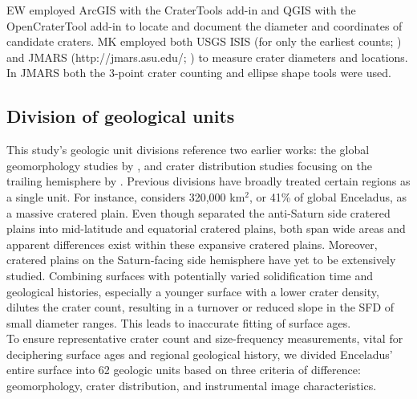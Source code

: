 \documentclass[preprint,11pt,3p,times,authoryear]{elsarticle}
\begin{document}
EW employed ArcGIS with the CraterTools add-in \citep{Kneissl2011} and QGIS with the OpenCraterTool add-in \citep{Heyer2023} to locate and document the diameter and coordinates of candidate craters. MK employed both USGS ISIS (for only the earliest counts; \citealt{Kirchoff2009}) and JMARS (http://jmars.asu.edu/; \citealt{Christensen2009}) to measure crater diameters and locations.  In JMARS both the 3-point crater counting and ellipse shape tools were used.

\subsection{Division of geological units}
\label{sub:gu}
This study’s geologic unit divisions reference two earlier works: the global geomorphology studies by \citet{CrowWillard2015}, and crater distribution studies focusing on the trailing hemisphere by \citet{Kirchoff2009}. Previous divisions have broadly treated certain regions as a single unit. For instance, \citet{CrowWillard2015} considers 320,000 km$^{2}$, or 41\% of global Enceladus, as a massive cratered plain. Even though \citet{Kirchoff2009} separated the anti-Saturn side cratered plains into mid-latitude and equatorial cratered plains, both span wide areas and apparent differences exist within these expansive cratered plains. Moreover, cratered plains on the Saturn-facing side hemisphere have yet to be extensively studied. Combining surfaces with potentially varied solidification time and geological histories, especially a younger surface with a lower crater density, dilutes the crater count, resulting in a turnover or reduced slope in the SFD of small diameter ranges. This leads to inaccurate fitting of surface ages. \\

To ensure representative crater count and size-frequency measurements, vital for deciphering surface ages and regional geological history, we divided Enceladus’ entire surface into 62 geologic units based on three criteria of difference: geomorphology, crater distribution, and instrumental image characteristics.
\end{document}
